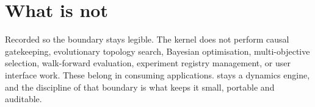 \documentclass[11pt,a4paper]{article}
\begin{document}
\section{What \gssk{} is not}

Recorded so the boundary stays legible. The kernel does not perform causal gatekeeping, evolutionary topology search, Bayesian optimisation, multi-objective selection, walk-forward evaluation, experiment registry management, or user interface work. These belong in consuming applications. \gssk{} stays a dynamics engine, and the discipline of that boundary is what keeps it small, portable and auditable.



\end{document}
